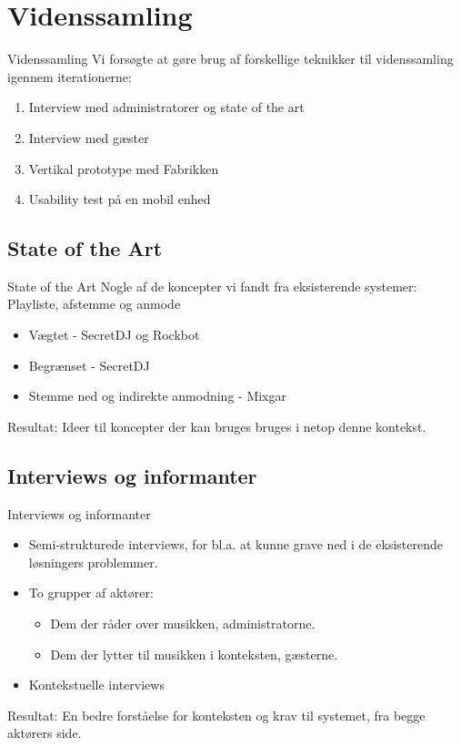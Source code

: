\section{Videnssamling}
\begin{frame}{Videnssamling}
Vi forsøgte at gøre brug af forskellige teknikker til videnssamling igennem iterationerne:
\begin{enumerate}
\item Interview med administratorer og state of the art
\item Interview med gæster
\item Vertikal prototype med Fabrikken
\item Usability test på en mobil enhed
\end{enumerate}
\end{frame}

\subsection{State of the Art}
\begin{frame}{State of the Art}
	Nogle af de koncepter vi fandt fra eksisterende systemer:
	Playliste, afstemme og anmode
	\begin{itemize}
	\item Vægtet - SecretDJ og Rockbot
	\item Begrænset - SecretDJ
	\item Stemme ned og indirekte anmodning - Mixgar
	\end{itemize}

	Resultat: Ideer til koncepter der kan bruges bruges i netop denne kontekst.
\end{frame}
\subsection{Interviews og informanter}
\begin{frame}{Interviews og informanter}
	\begin{itemize}
	\item Semi-strukturede interviews, for bl.a. at kunne grave ned i de eksisterende løsningers problemmer.

	\item To grupper af aktører:
	\begin{itemize}
		\item Dem der råder over musikken, administratorne.
		\item Dem der lytter til musikken i konteksten, gæsterne.
	\end{itemize}

	\item Kontekstuelle interviews
	\end{itemize}
	Resultat: En bedre forståelse for konteksten og krav til systemet, fra begge aktørers side.
\end{frame}
